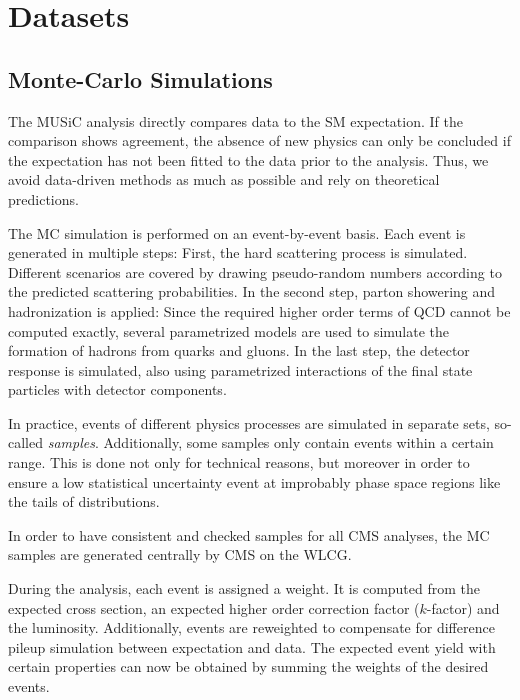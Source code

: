 
\chapter{Datasets}
\section{Monte-Carlo Simulations}
The \ac{MUSiC} analysis directly compares data to the \ac{SM} expectation. If the comparison shows agreement, the absence of new physics can only be concluded if the expectation has not been fitted to the data prior to the analysis. Thus, we avoid data-driven methods as much as possible and rely on theoretical predictions.

The \ac{MC} simulation is performed on an event-by-event basis. Each event is generated in multiple steps: First, the hard scattering process is simulated. Different scenarios are covered by drawing pseudo-random numbers according to the predicted scattering probabilities. In the second step, parton showering and hadronization is applied: Since the required higher order terms of \ac{QCD} cannot be computed exactly, several parametrized models are used to simulate the formation of hadrons from quarks and gluons. In the last step, the detector response is simulated, also using parametrized interactions of the final state particles with detector components.

In practice, events of different physics processes are simulated in separate sets, so-called \emph{samples}. Additionally, some samples only contain events within a certain \pT range. This is done not only for technical reasons, but moreover in order to ensure a low statistical uncertainty event at improbably phase space regions like the tails of distributions.

In order to have consistent and checked samples for all \ac{CMS} analyses, the \ac{MC} samples are generated centrally by \ac{CMS} on the \ac{WLCG}.

During the analysis, each event is assigned a weight. It is computed from the expected cross section, an expected higher order correction factor ($k$-factor) and the luminosity. 
Additionally, events are reweighted to compensate for difference pileup simulation between expectation and data. 
The expected event yield with certain properties can now be obtained by summing the weights of the desired events.

